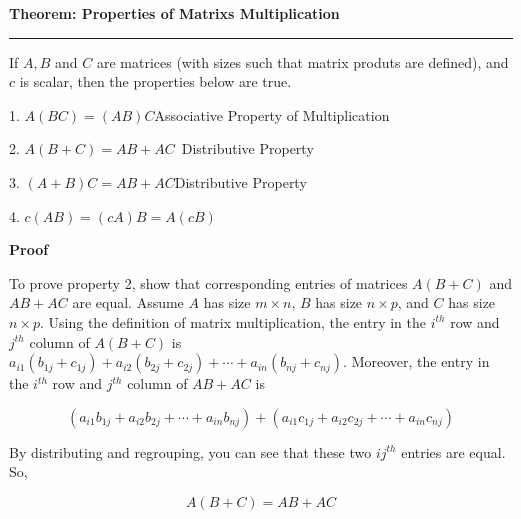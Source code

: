 \nopagenumbers
{\bf Theorem: Properties of Matrixs Multiplication}
\vskip 1mm
\hrule

\vskip 6pt

If $A,B$ and $C$ are matrices (with sizes such that matrix produts are defined), and $c$ is scalar, then the properties below are true.

\vskip 10pt
1. $A(BC)=(AB)C$\quad\quad\quad\quad\quad\quad\quad\quad Associative Property of Multiplication

\vskip 6pt
2. $A(B+C)=AB+AC$\quad\quad\quad\quad\quad$\,$ Distributive Property

\vskip 6pt
3. $(A+B)C=AB+AC$\quad\quad\quad\quad\quad\quad Distributive Property

\vskip 6pt
4. $c(AB)=(cA)B=A(cB)$

\vskip 10pt
{\bf Proof}

\vskip 6pt
To prove property 2, show that corresponding entries of matrices $A(B+C)$ and $AB+AC$ are equal. Assume $A$ has size $m\times n$, $B$ has size $n\times p$, and $C$ has size $n\times p$. Using the definition of matrix multiplication, the entry in the $i^{th}$ row and $j^{th}$ column of $A(B+C)$ is $a_{i1}(b_{1j}+c_{1j})+a_{i2}(b_{2j}+c_{2j})+\cdots+a_{in}(b_{nj}+c_{nj})$. Moreover, the entry in the $i^{th}$ row and $j^{th}$ column of $AB+AC$ is

$$(a_{i1}b_{1j}+a_{i2}b_{2j}+\cdots+a_{in}b_{nj})+(a_{i1}c_{1j}+a_{i2}c_{2j}+\cdots+a_{in}c_{nj})$$

By distributing and regrouping, you can see that these two $ij^{th}$ entries are equal. So,

$$A(B+C)=AB+AC$$

\vfill\eject
\bye
